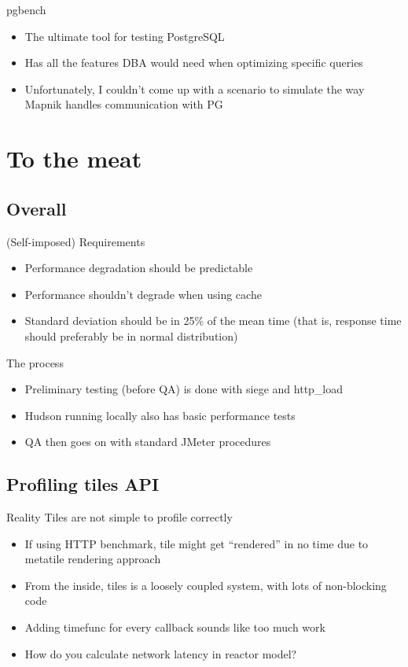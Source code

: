 \documentclass[16pt]{beamer}
\begin{document}
\begin{frame}{pgbench}
  \begin{itemize}
  \item The ultimate tool for testing PostgreSQL
  \item Has all the features DBA would need when optimizing specific queries
  \item Unfortunately, I couldn't come up with a scenario to simulate the way Mapnik handles communication with PG
  \end{itemize}
\end{frame}

\section{To the meat}

\subsection{Overall}

\begin{frame}{(Self-imposed) Requirements}
  \begin{itemize}
  \item Performance degradation should be predictable
  \item Performance shouldn't degrade when using cache
  \item Standard deviation should be in 25\% of the mean time (that is, response time should preferably be in normal distribution)
  \end{itemize}
\end{frame}

\begin{frame}{The process}
  \begin{itemize}
  \item Preliminary testing (before QA) is done with siege and http\_load
  \item Hudson running locally also has basic performance tests
  \item QA then goes on with standard JMeter procedures
  \end{itemize}
\end{frame}

\subsection{Profiling tiles API}

\begin{frame}{Reality}
  Tiles are not simple to profile correctly
  \begin{itemize}
  \item If using HTTP benchmark, tile might get ``rendered'' in no time due to metatile rendering approach
  \item From the inside, tiles is a loosely coupled system, with lots of non-blocking code
  \item Adding timefunc for every callback sounds like too much work
  \item How do you calculate network latency in reactor model?
  \end{itemize}
\end{frame}
\end{document}
